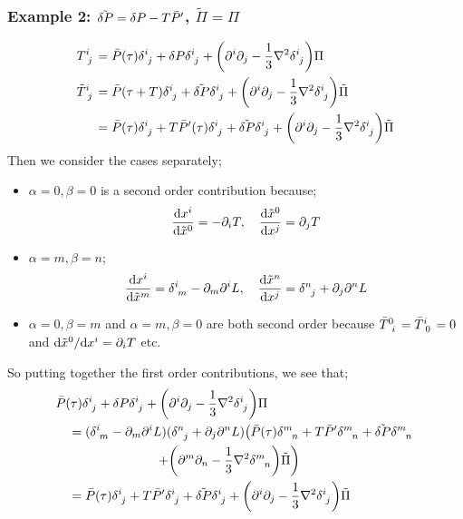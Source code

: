 \subsubsection*{Example 2: $\tilde{\delta P} = \delta P - T\bar{P}^{\prime}$, $\tilde{\Pi} = \Pi$}
\begin{align*}
T\indices{^{i}_{j}} &= \bar{P}(\tau) \delta\indices{^{i}_{j}} + \delta P \delta\indices{^{i}_{j}} + \left(\del^i \del_j - \frac{1}{3}\nabla^2 \delta\indices{^{i}_{j}}\right)\Pi \\
\tilde{T}\indices{^{i}_{j}} &= \bar{P}(\tau + T)\delta\indices{^{i}_{j}} + \tilde{\delta P} \delta\indices{^{i}_{j}} + \left(\del^i \del_j - \frac{1}{3}\nabla^2 \delta\indices{^{i}_{j}}\right)\tilde{\Pi} \\
&= \bar{P}(\tau)\delta\indices{^{i}_{j}} + T\bar{P}\pr(\tau)\delta\indices{^{i}_{j}}+ \tilde{\delta P} \delta\indices{^{i}_{j}} + \left(\del^i \del_j - \frac{1}{3}\nabla^2 \delta\indices{^{i}_{j}}\right)\tilde{\Pi}
\end{align*}
Then we consider the cases separately;
\begin{itemize}
\item $\alpha = 0, \beta = 0$ is a second order contribution because;
\begin{equation*}
\frac{\text{d} x^i}{\text{d} \tilde{x}^0} = -\partial_i T, \quad \frac{\text{d} \tilde{x}^0}{\text{d} x^j} = \partial_j T
\end{equation*}
\item $\alpha = m, \beta = n$;
\begin{equation*}
\frac{\ud x^i}{\ud \tilde{x}^m} = \delta\indices{^{i}_{m}} - \del_m \del^i L, \quad \frac{\ud \tilde{x}^n}{\ud x^j} = \delta\indices{^{n}_{j}} + \del_j \del^n L
\end{equation*}
\item $\alpha = 0, \beta = m$ and $\alpha = m, \beta = 0$ are both second order because $\bar{T}\indices{^{0}_{i}} = \bar{T}\indices{^{i}_{0}} = 0$ and $\text{d} \tilde{x}^0 / \text{d} x^i = \partial_i T$ etc.
\end{itemize}
So putting together the first order contributions, we see that;
\begin{align*}
&\bar{P}(\tau)\delta\indices{^{i}_{j}} + \delta P \delta\indices{^{i}_{j}} + \left(\del^i \del_j - \frac{1}{3}\nabla^2 \delta\indices{^{i}_{j}}\right)\Pi \\
&\quad = (\delta\indices{^{i}_{m}} - \del_m \del^i L)(\delta\indices{^{n}_{j}} + \del_j \del^n L)\left(\bar{P}(\tau) \delta \indices{^{m}_{n}} + T\bar{P}\pr \delta\indices{^{m}_{n}} + \tilde{\delta P}\delta\indices{^{m}_{n}} \right.\\
&\qquad \qquad \qquad \qquad \left. + \left(\del^m \del_n - \frac{1}{3}\nabla^2 \delta\indices{^{m}_{n}}\right)\tilde{\Pi}\right) \\
&\quad = \bar{P}(\tau)\delta\indices{^{i}_{j}} + T \bar{P}\pr \delta\indices{^{i}_{j}} + \tilde{\delta P}\delta\indices{^{i}_{j}} + \left(\del^i\del_j - \frac{1}{3}\nabla^2 \delta\indices{^{i}_{j}}\right)\tilde{\Pi}
\end{align*}

